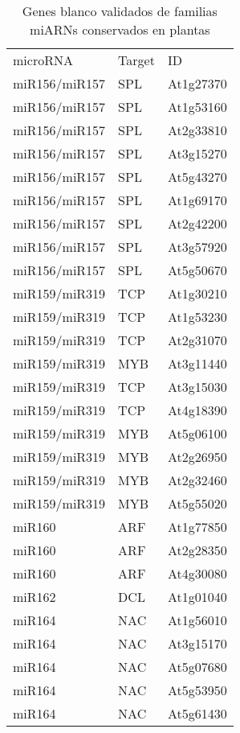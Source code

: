 \begin{table}
\tiny
\centering
\caption{Genes blanco validados de familias miARNs conservados en plantas}
\label{table:NAR_table_S3}
\begin{tabular}{lll}
microRNA      & Target       & ID        \\
miR156/miR157 & SPL          & At1g27370 \\
miR156/miR157 & SPL          & At1g53160 \\
miR156/miR157 & SPL          & At2g33810 \\
miR156/miR157 & SPL          & At3g15270 \\
miR156/miR157 & SPL          & At5g43270 \\
miR156/miR157 & SPL          & At1g69170 \\
miR156/miR157 & SPL          & At2g42200 \\
miR156/miR157 & SPL          & At3g57920 \\
miR156/miR157 & SPL          & At5g50670 \\
miR159/miR319 & TCP          & At1g30210 \\
miR159/miR319 & TCP          & At1g53230 \\
miR159/miR319 & TCP          & At2g31070 \\
miR159/miR319 & MYB          & At3g11440 \\
miR159/miR319 & TCP          & At3g15030 \\
miR159/miR319 & TCP          & At4g18390 \\
miR159/miR319 & MYB          & At5g06100 \\
miR159/miR319 & MYB          & At2g26950 \\
miR159/miR319 & MYB          & At2g32460 \\
miR159/miR319 & MYB          & At5g55020 \\
miR160        & ARF          & At1g77850 \\
miR160        & ARF          & At2g28350 \\
miR160        & ARF          & At4g30080 \\
miR162        & DCL          & At1g01040 \\
miR164        & NAC          & At1g56010 \\
miR164        & NAC          & At3g15170 \\
miR164        & NAC          & At5g07680 \\
miR164        & NAC          & At5g53950 \\
miR164        & NAC          & At5g61430 \\

\end{tabular}
\end{table}
